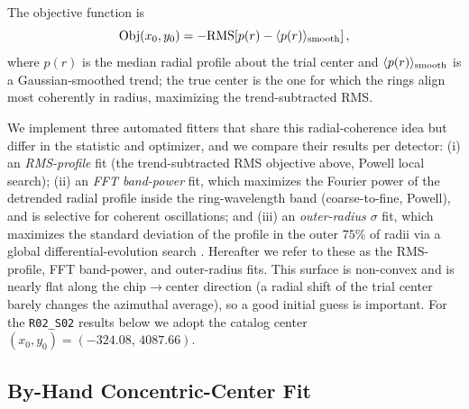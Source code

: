 The objective function is
%
\begin{equation}
{\rm Obj}(x_0, y_0) = -{\rm RMS}\!\left[ p(r) - \langle p(r) \rangle_{\rm smooth} \right],
\end{equation}
%
where $p(r)$ is the median radial profile about the trial center and
$\langle p(r)\rangle_{\rm smooth}$ is a Gaussian-smoothed trend; the true center is the one
for which the rings align most coherently in radius, maximizing the trend-subtracted RMS.

We implement three automated fitters that share this radial-coherence idea but differ in the
statistic and optimizer, and we compare their results per detector: (i) an \emph{RMS-profile}
fit (the trend-subtracted RMS objective above, Powell local search); (ii) an \emph{FFT
band-power} fit, which maximizes the Fourier power of the detrended radial profile inside the
ring-wavelength band (coarse-to-fine, Powell), and is selective for coherent oscillations; and
(iii) an \emph{outer-radius $\sigma$} fit, which maximizes the standard deviation of the profile
in the outer $75\%$ of radii via a global differential-evolution search
\citep[after][]{Esteves2023}. Hereafter we refer to these as the RMS-profile, FFT band-power,
and outer-radius fits.
This surface is non-convex and is nearly flat along the chip$\to$center direction (a radial
shift of the trial center barely changes the azimuthal average), so a good initial guess is
important. For the \texttt{R02\_S02} results below we adopt the catalog center
$(x_0, y_0) = (-324.08,\,4087.66)$.

\subsection{By-Hand Concentric-Center Fit} \label{sec:handfit}

